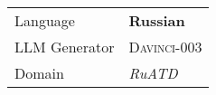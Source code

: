 \begin{center}
\begin{supertabular}{l | p{12cm}}
        Language &  \textbf{Russian} \\
        LLM Generator & \textsc{Davinci-003} \\
        Domain &  \textit{RuATD} \\
        \midrule

\end{supertabular}
\end{center}
